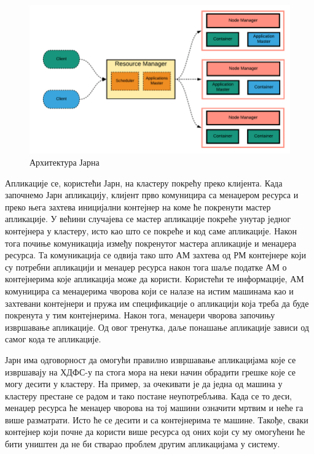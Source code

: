 \documentclass[12pt,oneside]{memoir}
\begin{document}
\begin{figure}[!ht]
  \centering
  \includegraphics[width=1\textwidth]{pictures/yarn.png}
  \caption{Архитектура Јарна}
  \label{fig:yarn_ar}
\end{figure}

Апликације се, користећи Јарн, на кластеру покрећу преко клијента. Када започнемо Јарн апликацију, клијент прво комуницира са менаџером ресурса и преко њега захтева иницијални контејнер на коме ће покренути мастер апликације. У већини случајева се мастер апликације покреће унутар једног контејнера у кластеру, исто као што се покреће и код саме апликације. Након тога почиње комуникација између покренутог мастера апликације и менаџера ресурса. Та комуникација се одвија тако што АМ захтева од РМ контејнере који су потребни апликацији и менаџер ресурса након тога шаље податке АМ о контејнерима које апликација може да користи. Користећи те информације, АМ комуницира са менаџерима чворова који се налазе на истим машинама као и захтевани контејнери и пружа им спецификације о апликацији која треба да буде покренута у тим контејнерима. Након тога, менаџери чворова започињу извршавање апликације. Од овог тренутка, даље понашање апликације зависи од самог кода те апликације. \cite{hadoop_learning}

Јарн има одговорност да омогући правилно извршавање апликацијама које се извршавају на ХДФС-у па стога мора на неки начин обрадити грешке које се могу десити у кластеру. На пример, за очекивати је да једна од машина у кластеру престане се радом и тако постане неупотребљива. Када се то деси, менаџер ресурса ће менаџер чворова на тој машини означити мртвим и неће га више разматрати. Исто ће се десити и са контејнерима те машине. Такође, сваки контејнер који почне да користи више ресурса од оних који су му омогућени ће бити уништен да не би стварао проблем другим апликацијама у систему. \cite{hadoop_learning}
\end{document}
